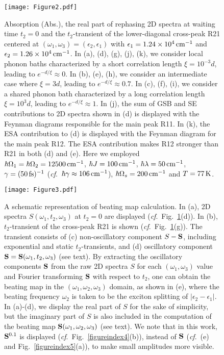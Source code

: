 \documentclass[%
 reprint,%
 amssymb, amsmath,%
 aip,cha,%
]{revtex4-1}
\newcommand{\abs}[1]{\left|#1\right|}
\begin{document}
\begin{figure*}[t]
	\texttt{[image: Figure2.pdf]}
	\caption{Absorption (Abs.), the real part of rephasing 2D spectra at waiting time $t_2=0$ and the $t_2$-transient of the lower-diagonal cross-peak R21 centered at $(\omega_1,\omega_3)=(\epsilon_2,\epsilon_1)$ with $\epsilon_1=1.24\times 10^{4}\,{\rm cm}^{-1}$ and $\epsilon_2=1.26\times 10^{4}\,{\rm cm}^{-1}$. In (a), (d), (g), (j), (k), we consider local phonon baths characterized by a short correlation length $\xi=10^{-3}d$, leading to $e^{-d/\xi}\approx 0$. In (b), (e), (h), we consider an intermediate case where $\xi=3d$, leading to $e^{-d/\xi}\approx 0.7$. In (c), (f), (i), we consider a shared phonon bath characterized by a long correlation length $\xi=10^{3}d$, leading to $e^{-d/\xi}\approx 1$. In (j), the sum of GSB and SE contributions to 2D spectra shown in (d) is displayed with the Feynman diagrams responsible for the main peak R11. In (k), the ESA contribution to (d) is displayed with the Feynman diagram for the main peak R12. The ESA contribution makes R12 stronger than R21 in both (d) and (e). Here we employed $\hbar\Omega_1=\hbar\Omega_2=12500\,{\rm cm}^{-1}$, $\hbar J=100\,{\rm cm}^{-1}$, $\hbar\lambda=50\,{\rm cm}^{-1}$, $\gamma=(50\,{\rm fs})^{-1}$ ({\it cf}.~$\hbar\gamma\approx 106\,{\rm cm}^{-1}$), $\hbar\Omega_s=200\,{\rm cm}^{-1}$ and $T=77\,{\rm K}$.}
	\label{figureindex2}
\end{figure*}

\begin{figure}[ht!]
	\texttt{[image: Figure3.pdf]}
	\caption{A schematic representation of beating map calculation. In (a), 2D spectra $S(\omega_1,t_2,\omega_3)$ at $t_2=0$ are displayed ({\it cf}.~Fig.~\ref{figureindex2}(d)). In (b), $t_2$-transient of the cross-peak R21 is shown  ({\it cf}.~Fig.~\ref{figureindex2}(g)). The transient consists of (c) non-oscillatory component $S-{\bf S}$, including exponential and static $t_2$-transients, and (d) oscillatory component ${\bf S}={\bf S}(\omega_1,t_2,\omega_3)$ (see text). By extracting the oscillatory components ${\bf S}$ from the raw 2D spectra $S$ for each $(\omega_1,\omega_3)$ value and Fourier transforming ${\bf S}$ with respect to $t_2$, one can obtain the beating map in the $(\omega_1,\omega_2,\omega_3)$ domain, as shown in (e), where the beating frequency $\omega_2$ is taken to be the exciton splitting of $\abs{\epsilon_2-\epsilon_1}$. In (a)-(d), we display the real part of $S$ for the sake of simplicity, but the imaginary part of $S$ is also included in the computation of the beating map ${\bf S}(\omega_1,\omega_2,\omega_3)$ (see text). We note that in this work, ${\bf S}^{0.1}$ is displayed ({\it cf}.~Fig.~\ref{figureindex4}(b)), instead of ${\bf S}$ ({\it cf}.~(e) and Fig.~\ref{figureindex5}(a)), to make small amplitudes more visible.}
	\label{figureindex3} 
\end{figure}
\end{document}
